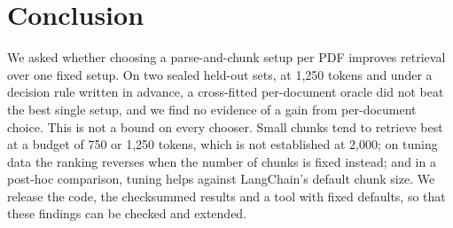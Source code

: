 \section{Conclusion}\label{sec:conclusion}

We asked whether choosing a parse-and-chunk setup per PDF improves retrieval
over one fixed setup. On two sealed held-out sets, at 1,250 tokens and
under a decision rule written in advance, a cross-fitted per-document oracle
did not beat the best single setup, and we find no evidence of a gain from
per-document choice. This is not a bound on every chooser. Small chunks tend to
retrieve best at a budget of 750 or 1,250 tokens, which is not established at
2,000; on tuning data the ranking reverses when the number of chunks is fixed
instead; and in a post-hoc comparison, tuning helps against LangChain's default
chunk size. We release the code, the checksummed results and a tool with fixed defaults, so that these findings can be
checked and extended.
